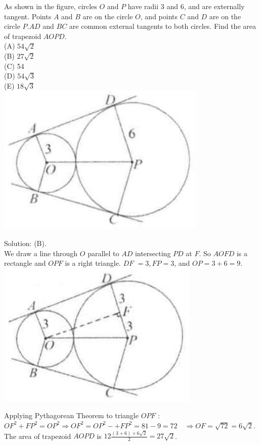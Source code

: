 \documentclass{article}
\begin{document}
As shown in the figure, circles \(O\) and \(P\) have radii 3 and 6, and are externally tangent. Points \(A\) and \(B\) are on the circle \(O\), and points \(C\) and \(D\) are on the circle \(P . A D\) and \(B C\) are common external tangents to both circles. Find the area of trapezoid \(A O P D\).\\
(A) \(54 \sqrt{2}\)\\
(B) \(27 \sqrt{2}\)\\
(C) 54\\
(D) \(54 \sqrt{3}\)\\
(E) \(18 \sqrt{3}\)\\
\centering
\includegraphics[width=\textwidth]{images/177(2).jpg}

Solution: (B).\\
We draw a line through \(O\) parallel to \(A D\) intersecting \(P D\) at \(F\). So \(A O F D\) is a rectangle and \(O P F\) is a right triangle. \(D F\) \(=3, F P=3\), and \(O P=3+6=9\).\\
\centering
\includegraphics[width=\textwidth]{images/177.jpg}

Applying Pythagorean Theorem to triangle \(O P F\) :\\
\(O F^{2}+F P^{2}=O P^{2} \Rightarrow O F^{2}=O P^{2}-+F P^{2}=81-9=72 \quad \Rightarrow O F=\sqrt{72}=6 \sqrt{2}\).\\
The area of trapezoid \(A O P D\) is \(12 \frac{(3+6) \times 6 \sqrt{2}}{2}=27 \sqrt{2}\).
\end{document}
